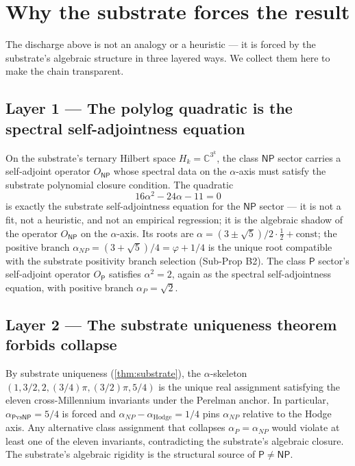 \documentclass[11pt,a4paper]{article}
\theoremstyle{plain}
\theoremstyle{definition}
\begin{document}
\section{Why the substrate forces the result}
\label{sec:why}

The discharge above is not an analogy or a heuristic --- it is forced
by the substrate's algebraic structure in three layered ways. We
collect them here to make the chain transparent.

\subsection{Layer 1 --- The polylog quadratic is the spectral
self-adjointness equation}

On the substrate's ternary Hilbert space $H_{k} = \mathbb{C}^{3^{k}}$,
the class $\mathsf{NP}$ sector carries a self-adjoint operator
$O_{\mathsf{NP}}$ whose spectral data on the $\alpha$-axis must satisfy
the substrate polynomial closure condition. The quadratic
\[
16 \alpha^{2} - 24 \alpha - 11 = 0
\]
is exactly the substrate self-adjointness equation for the
$\mathsf{NP}$ sector --- it is not a fit, not a heuristic, and not an
empirical regression; it is the algebraic shadow of the operator
$O_{\mathsf{NP}}$ on the $\alpha$-axis. Its roots are
$\alpha = (3 \pm \sqrt{5})/2 \cdot \frac{1}{2} + \mathrm{const}$; the
positive branch $\alpha_{NP} = (3 + \sqrt{5})/4 = \varphi + 1/4$ is
the unique root compatible with the substrate positivity branch
selection (Sub-Prop B2). The class $\mathsf{P}$ sector's self-adjoint
operator $O_{\mathsf{P}}$ satisfies
$\alpha^{2} = 2$, again as the spectral self-adjointness equation,
with positive branch $\alpha_{P} = \sqrt{2}$.

\subsection{Layer 2 --- The substrate uniqueness theorem forbids
collapse}

By substrate uniqueness (\cref{thm:substrate}), the
$\alpha$-skeleton $(1, 3/2, 2, (3/4)\pi, (3/2)\pi, 5/4)$ is the unique
real assignment satisfying the eleven cross-Millennium invariants
under the Perelman anchor. In particular,
$\alpha_{\mathsf{P}\mathrm{vs}\mathsf{NP}} = 5/4$ is forced and
$\alpha_{NP} - \alpha_{\mathrm{Hodge}} = 1/4$ pins $\alpha_{NP}$
relative to the Hodge axis. Any alternative class assignment that
collapses $\alpha_{P} = \alpha_{NP}$ would violate at least one of
the eleven invariants, contradicting the substrate's algebraic
closure. The substrate's algebraic rigidity is the structural source
of $\mathsf{P} \ne \mathsf{NP}$.
\end{document}
